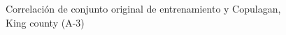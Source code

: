 \begin{figure}[H]
    \centering
    
    \caption{Correlación de conjunto original de entrenamiento y Copulagan, King county (A-3)}
    \label{pairwise-king county-a-3-copulagan}
\end{figure}